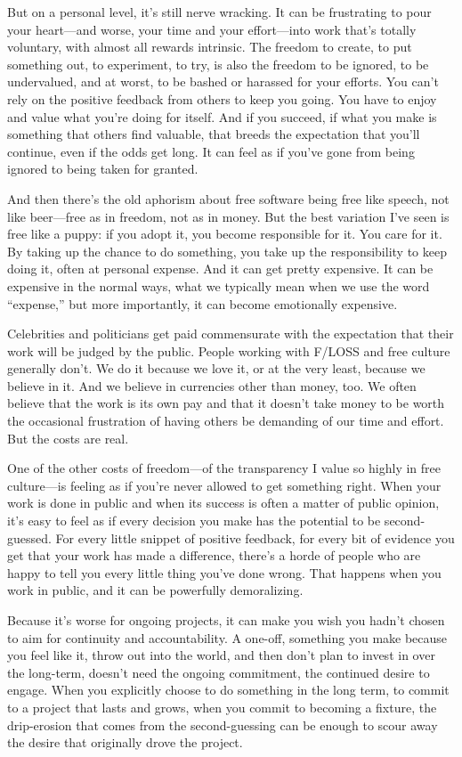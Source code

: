 But on a personal level, it's still nerve wracking. It can be
frustrating to pour your heart---and worse, your time and your
effort---into work that's totally voluntary, with almost all rewards
intrinsic. The freedom to create, to put something out, to experiment,
to try, is also the freedom to be ignored, to be undervalued, and at
worst, to be bashed or harassed for your efforts. You can't rely on the
positive feedback from others to keep you going. You have to enjoy and
value what you're doing for itself. And if you succeed, if what you make
is something that others find valuable, that breeds the expectation that
you'll continue, even if the odds get long. It can feel as if you've
gone from being ignored to being taken for granted.

And then there's the old aphorism about free software being free like
speech, not like beer---free as in freedom, not as in money. But the
best variation I've seen is free like a puppy: if you adopt it, you
become responsible for it. You care for it. By taking up the chance to
do something, you take up the responsibility to keep doing it, often at
personal expense. And it can get pretty expensive. It can be expensive
in the normal ways, what we typically mean when we use the word
``expense,'' but more importantly, it can become emotionally expensive.

Celebrities and politicians get paid commensurate with the expectation
that their work will be judged by the public. People working with F/LOSS
and free culture generally don't. We do it because we love it, or at the
very least, because we believe in it. And we believe in currencies other
than money, too. We often believe that the work is its own pay and that
it doesn't take money to be worth the occasional frustration of having
others be demanding of our time and effort. But the costs are real.

One of the other costs of freedom---of the transparency I value so
highly in free culture---is feeling as if you're never allowed to get
something right. When your work is done in public and when its success
is often a matter of public opinion, it's easy to feel as if every
decision you make has the potential to be second-guessed. For every
little snippet of positive feedback, for every bit of evidence you get
that your work has made a difference, there's a horde of people who are
happy to tell you every little thing you've done wrong. That happens
when you work in public, and it can be powerfully demoralizing.

Because it's worse for ongoing projects, it can make you wish you hadn't
chosen to aim for continuity and accountability. A one-off, something
you make because you feel like it, throw out into the world, and then
don't plan to invest in over the long-term, doesn't need the ongoing
commitment, the continued desire to engage. When you explicitly choose
to do something in the long term, to commit to a project that lasts and
grows, when you commit to becoming a fixture, the drip-erosion that
comes from the second-guessing can be enough to scour away the desire
that originally drove the project.

